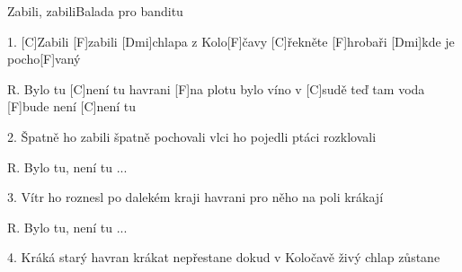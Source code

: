 \begin{song}{Zabili, zabili}{Balada pro banditu}
\begin{xverse}{1. }
[C]Zabili [F]zabili [Dmi]chlapa z Kolo[F]{ča}vy
[C]{ře}kněte [F]hrobaři [Dmi]kde je pocho[F]vaný
\end{xverse}

\begin{xverse}{R. }
Bylo tu [C]není tu havrani [F]na plotu
bylo víno v [C]sudě teď tam voda [F]bude
není [C]není tu
\end{xverse}

\begin{xverse}{2. }
Špatně ho zabili špatně pochovali
vlci ho pojedli ptáci rozklovali
\end{xverse}

\begin{xverse}{R. }
Bylo tu, není tu ...
\end{xverse}

\begin{xverse}{3. }
Vítr ho roznesl po dalekém kraji
havrani pro něho na poli krákají
\end{xverse}

\begin{xverse}{R. }
Bylo tu, není tu ...
\end{xverse}

\begin{xverse}{4. }
Kráká starý havran krákat nepřestane
dokud v Koločavě živý chlap zůstane
\end{xverse}

\end{song}

